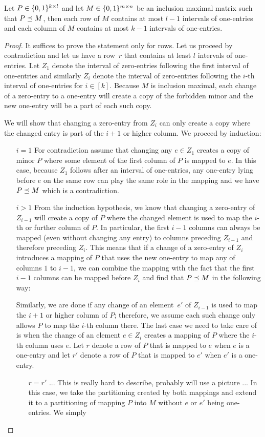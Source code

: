 \begin{lemma}
Let $P\in\{0,1\}^{k\times l}$ and let $M\in\{0,1\}^{m\times n}$ be an inclusion maximal matrix such that $P\preceq M$, then each row of $M$ contains at most $l-1$ intervals of one-entries and each column of $M$ contains at most $k-1$ intervals of one-entries.
\end{lemma}
\begin{proof}
It suffices to prove the statement only for rows. Let us proceed by contradiction and let us have a row~$r$ that contains at least $l$ intervals of one-entries. Let $Z_1$ denote the interval of zero-entries following the first interval of one-entries and similarly $Z_i$ denote the interval of zero-entries following the $i$-th interval of one-entries for $i\in[k]$. Because $M$ is inclusion maximal, each change of a zero-entry to a one-entry will create a copy of the forbidden minor and the new one-entry will be a part of each such copy.

We will show that changing a zero-entry from $Z_i$ can only create a copy where the changed entry is part of the $i+1$ or higher column. We proceed by induction:
\begin{itemize}
\item[$i=1$] For contradiction assume that changing any $e\in Z_1$ creates a copy of minor $P$ where some element of the first column of $P$ is mapped to $e$. In this case, because $Z_1$ follows after an interval of one-entries, any one-entry lying before $e$ on the same row can play the same role in the mapping and we have $P\preceq M$ which is a contradiction. 
\item[$i>1$] From the induction hypothesis, we know that changing a zero-entry of $Z_{i-1}$ will create a copy of $P$ where the changed element is used to map the $i$-th or further column of $P$. In particular, the first $i-1$ columns can always be mapped (even without changing any entry) to columns preceding $Z_{i-1}$ and therefore preceding $Z_{i}$. This means that if a change of a zero-entry of $Z_i$ introduces a mapping of $P$ that uses the new one-entry to map any of columns $1$ to $i-1$, we can combine the mapping with the fact that the first $i-1$ columns can be mapped before $Z_i$ and find that $P\preceq M$ in the following way:

Similarly, we are done if any change of an element~$e'$ of $Z_{i-1}$ is used to map the $i+1$ or higher column of $P$; therefore, we assume each such change only allows $P$ to map the $i$-th column there. The last case we need to take care of is when the change of an element $e\in Z_i$ creates a mapping of $P$ where the $i$-th column uses $e$. Let $r$ denote a row of $P$ that is mapped to $e$ when $e$ is a one-entry and let $r'$ denote a row of $P$ that is mapped to $e'$ when $e'$ is a one-entry.
\begin{itemize}
\item[$r=r'$] ... This is really hard to describe, probably will use a picture ... In this case, we take the partitioning created by both mappings and extend it to a partitioning of mapping $P$ into $M$ without $e$ or $e'$ being one-entries. We simply
\end{itemize}
\end{itemize}
\end{proof}

